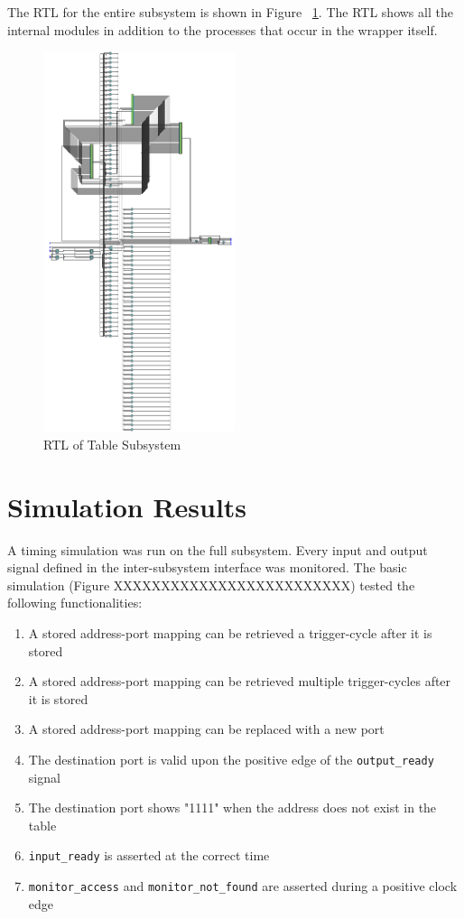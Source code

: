\documentclass{article}
\begin{document}
The RTL for the entire subsystem is shown in Figure ~\ref{fig:table-rtl}. The RTL shows all the internal modules in addition to the processes that occur in the wrapper itself.

\begin{figure}[ht!]
  \centering
    \includegraphics[width=0.5\textwidth]{table_rtl.PNG}
  \caption{RTL of Table Subsystem}
  \label{fig:table-rtl}
\end{figure}

\newpage
\section{Simulation Results}

A timing simulation was run on the full subsystem. Every input and output signal defined in the inter-subsystem interface was monitored. The basic simulation (Figure XXXXXXXXXXXXXXXXXXXXXXXXX) tested the following functionalities:

\begin{enumerate}
\item A stored address-port mapping can be retrieved a trigger-cycle after it is stored
\item A stored address-port mapping can be retrieved multiple trigger-cycles after it is stored
\item A stored address-port mapping can be replaced with a new port
\item The destination port is valid upon the positive edge of the \texttt{output\_ready} signal
\item The destination port shows "1111" when the address does not exist in the table
\item \texttt{input\_ready} is asserted at the correct time
\item \texttt{monitor\_access} and \texttt{monitor\_not\_found} are asserted during a positive clock edge
\end{enumerate}
\end{document}

